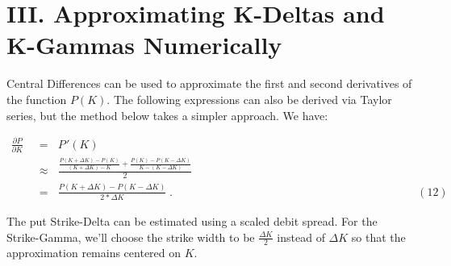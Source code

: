 \documentclass[12pt]{article}
\begin{document}
\section*{\large III. \indent Approximating K-Deltas and K-Gammas Numerically}

\vspace{15pt}

\begin{paragraph}
\indent Central Differences can be used to approximate the first and second derivatives of the function $P(K)$. The following expressions can also be derived via Taylor series, but the method below takes a simpler approach. We have:
\end{paragraph}

{\small
\begin{align*}
\frac{\partial P}{\partial K}   \hspace{4pt} &= \hspace{7pt}   P\hspace{1pt}'(K)
\\[20pt]
\hspace{4pt} &\approx \hspace{7pt}   \frac{\frac{P(K+\Delta K)-P(K)}{(K+\Delta K)-K} + \frac{P(K)-P(K-\Delta K)}{K-(K-\Delta K)}}{2}
\\[20pt]
\hspace{4pt} &= \hspace{7pt}   \frac{P(K+\Delta K)-P(K-\Delta K)}{2*\Delta K} \hspace{3pt}. \hspace{260pt} (12)
\end{align*}
}

\begin{paragraph}
\indent The put Strike-Delta can be estimated using a scaled debit spread. For the Strike-Gamma, we'll choose the strike width to be $\frac{\Delta K}{2}$ instead of $\Delta K$ so that the approximation remains centered on $K$.
\end{paragraph}
\end{document}
